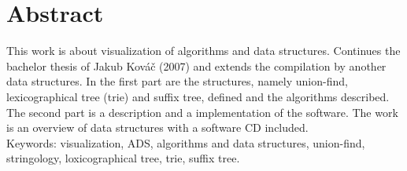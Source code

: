\newpage

\chapter*{Abstract}
This work is about visualization of algorithms and data structures. Continues 
the bachelor thesis of Jakub Kováč (2007) and extends the compilation by 
another data structures. In the first part are the structures, namely 
union-find, lexicographical tree (trie) and suffix tree, defined and the 
algorithms described. The second part is a description and a implementation of 
the software. The work is an overview of data structures with a software CD 
included.\\
Keywords: visualization, ADS, algorithms and data structures, union-find, 
stringology, loxicographical tree, trie, suffix tree.
\newpage

\mbox{}
\newpage

\tableofcontents\newpage
